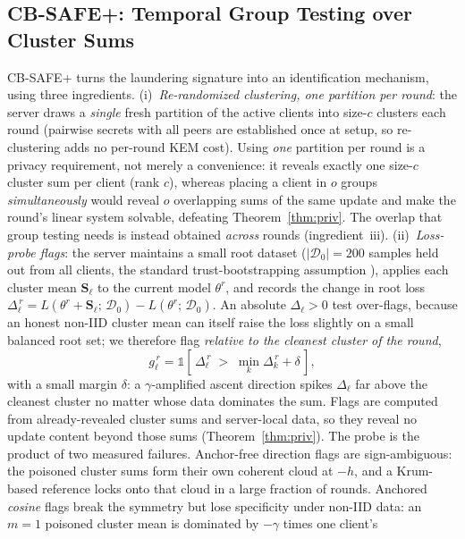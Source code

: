 \documentclass[lettersize,journal]{IEEEtran}
\begin{document}
\subsection{CB-SAFE+: Temporal Group Testing over Cluster Sums}\label{sec:defense}
CB-SAFE+ turns the laundering signature into an identification mechanism, using
three ingredients. (i)~\emph{Re-randomized clustering, one partition per round}: the
server draws a \emph{single} fresh partition of the active clients into size-$c$
clusters each round (pairwise secrets with all peers are established once at setup, so
re-clustering adds no per-round KEM cost). Using \emph{one} partition per round is a
privacy requirement, not merely a convenience: it reveals exactly one size-$c$ cluster
sum per client (rank $c$), whereas placing a client in $o$ groups
\emph{simultaneously} would reveal $o$ overlapping sums of the same update and make the
round's linear system solvable, defeating Theorem~\ref{thm:priv}. The overlap that
group testing needs is instead obtained \emph{across} rounds (ingredient~iii).
(ii)~\emph{Loss-probe flags}: the server maintains a small root dataset
($|\mathcal{D}_0|{=}200$ samples held out from all clients, the standard
trust-bootstrapping assumption \cite{fltrust,zeno}), applies each cluster mean
$\mathbf{S}_\ell$ to the current model $\theta^r$, and records the change in root loss
$\Delta_\ell^{\,r}=L(\theta^r+\mathbf{S}_\ell;\,\mathcal{D}_0)-L(\theta^r;\,\mathcal{D}_0)$.
An absolute $\Delta_\ell>0$ test over-flags, because an honest non-IID cluster mean can
itself raise the loss slightly on a small balanced root set; we therefore flag
\emph{relative to the cleanest cluster of the round},
\begin{equation}\label{eq:flag}
g_\ell^{\,r} = \mathbb{1}\!\left[\, \Delta_\ell^{\,r} \;>\; \min_{k}\Delta_k^{\,r} + \delta \,\right],
\end{equation}
with a small margin $\delta$: a $\gamma$-amplified ascent direction spikes
$\Delta_\ell$ far above the cleanest cluster no matter whose data dominates the sum.
Flags are computed from already-revealed cluster sums
and server-local data, so they reveal no update content beyond those sums
(Theorem~\ref{thm:priv}). The probe is
the product of two measured failures. Anchor-free direction flags are
sign-ambiguous: the poisoned cluster sums form their own coherent cloud at $-h$, and
a Krum-based reference locks onto that cloud in a large fraction of rounds.
Anchored \emph{cosine} flags break the symmetry but lose specificity under non-IID
data: an $m{=}1$ poisoned cluster mean is dominated by $-\gamma$ times one client's
\end{document}
